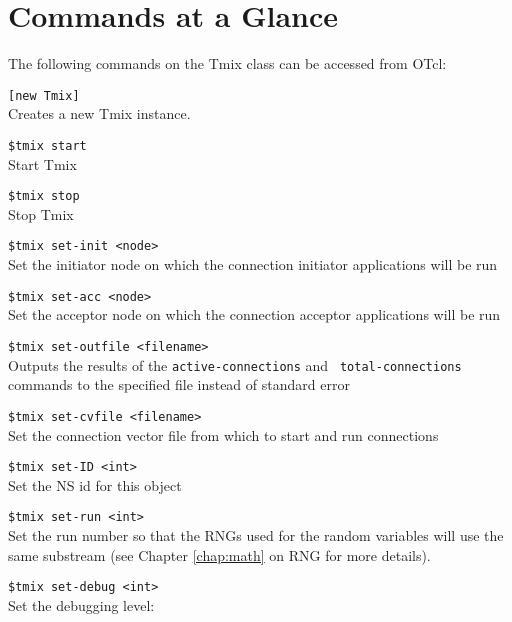 \section{Commands at a Glance}
The following commands on the Tmix class can be accessed from OTcl:

{\tt [new Tmix]}\\
Creates a new Tmix instance.

{\tt \$tmix start}\\
Start Tmix

{\tt \$tmix stop}\\
Stop Tmix

{\tt \$tmix set-init <node>}\\
Set the initiator node on which the connection initiator applications will be run

{\tt \$tmix set-acc <node>}\\
Set the acceptor node on which the connection acceptor applications will be run

{\tt \$tmix set-outfile <filename>}\\
Outputs the results of the {\tt active-connections} and {\tt
  total-connections} commands to the specified file instead of standard error

{\tt \$tmix set-cvfile <filename>}\\
Set the connection vector file from which to start and run connections

{\tt \$tmix set-ID <int>}\\
Set the NS id for this object

{\tt \$tmix set-run <int>}\\
Set the run number so that the RNGs used for the random variables will
use the same substream (see Chapter \ref{chap:math} on RNG for more details).

{\tt \$tmix set-debug <int>}\\
Set the debugging level:


